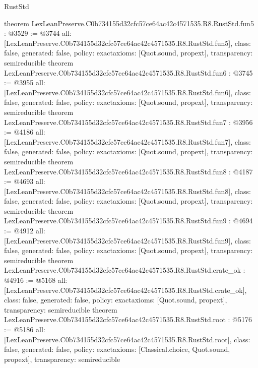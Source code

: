 \begin{lexlean}{RustStd}
\begin{coremodule}
{}
theorem LexLeanPreserve.C0b734155d32cfc57ce64ac42c4571535.R8.RustStd.fun5 : @3529 := @3744 {
  all: [LexLeanPreserve.C0b734155d32cfc57ce64ac42c4571535.R8.RustStd.fun5],
  class: false,
  generated: false,
  policy: exact{axioms: [Quot.sound, propext]},
  transparency: semireducible
}
theorem LexLeanPreserve.C0b734155d32cfc57ce64ac42c4571535.R8.RustStd.fun6 : @3745 := @3955 {
  all: [LexLeanPreserve.C0b734155d32cfc57ce64ac42c4571535.R8.RustStd.fun6],
  class: false,
  generated: false,
  policy: exact{axioms: [Quot.sound, propext]},
  transparency: semireducible
}
theorem LexLeanPreserve.C0b734155d32cfc57ce64ac42c4571535.R8.RustStd.fun7 : @3956 := @4186 {
  all: [LexLeanPreserve.C0b734155d32cfc57ce64ac42c4571535.R8.RustStd.fun7],
  class: false,
  generated: false,
  policy: exact{axioms: [Quot.sound, propext]},
  transparency: semireducible
}
theorem LexLeanPreserve.C0b734155d32cfc57ce64ac42c4571535.R8.RustStd.fun8 : @4187 := @4693 {
  all: [LexLeanPreserve.C0b734155d32cfc57ce64ac42c4571535.R8.RustStd.fun8],
  class: false,
  generated: false,
  policy: exact{axioms: [Quot.sound, propext]},
  transparency: semireducible
}
theorem LexLeanPreserve.C0b734155d32cfc57ce64ac42c4571535.R8.RustStd.fun9 : @4694 := @4912 {
  all: [LexLeanPreserve.C0b734155d32cfc57ce64ac42c4571535.R8.RustStd.fun9],
  class: false,
  generated: false,
  policy: exact{axioms: [Quot.sound, propext]},
  transparency: semireducible
}
theorem LexLeanPreserve.C0b734155d32cfc57ce64ac42c4571535.R8.RustStd.crate_ok : @4916 := @5168 {
  all: [LexLeanPreserve.C0b734155d32cfc57ce64ac42c4571535.R8.RustStd.crate_ok],
  class: false,
  generated: false,
  policy: exact{axioms: [Quot.sound, propext]},
  transparency: semireducible
}
theorem LexLeanPreserve.C0b734155d32cfc57ce64ac42c4571535.R8.RustStd.root : @5176 := @5186 {
  all: [LexLeanPreserve.C0b734155d32cfc57ce64ac42c4571535.R8.RustStd.root],
  class: false,
  generated: false,
  policy: exact{axioms: [Classical.choice, Quot.sound, propext]},
  transparency: semireducible
}


\end{coremodule}
\end{lexlean}
